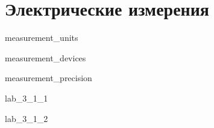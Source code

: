 \chapter{Электрические измерения}


 {measurement_units}

 {measurement_devices}

 {measurement_precision}

\newpage


 {lab_3_1_1}

 {lab_3_1_2}

